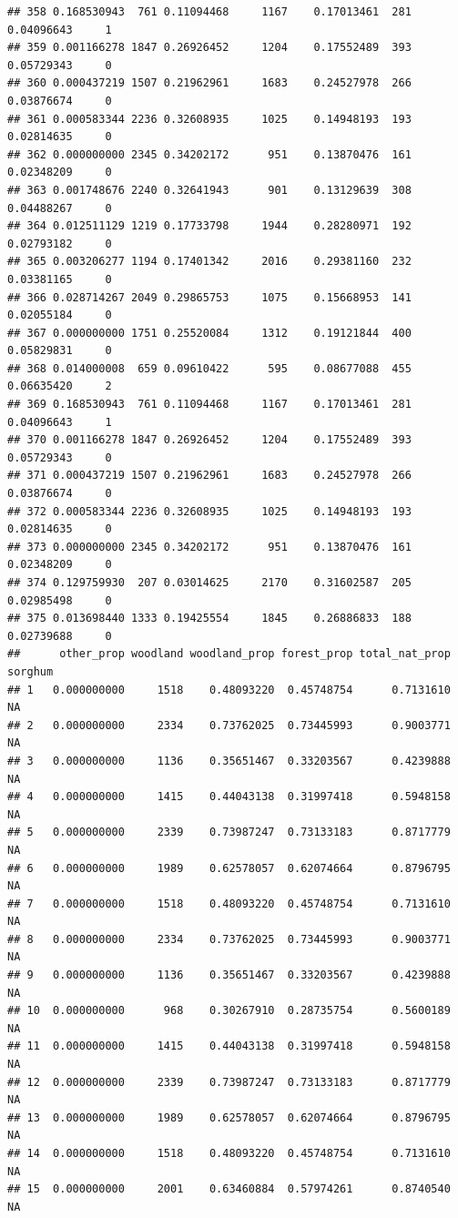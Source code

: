 \documentclass[
]{article}
\begin{document}
\begin{verbatim}
## 358 0.168530943  761 0.11094468     1167    0.17013461  281 0.04096643     1
## 359 0.001166278 1847 0.26926452     1204    0.17552489  393 0.05729343     0
## 360 0.000437219 1507 0.21962961     1683    0.24527978  266 0.03876674     0
## 361 0.000583344 2236 0.32608935     1025    0.14948193  193 0.02814635     0
## 362 0.000000000 2345 0.34202172      951    0.13870476  161 0.02348209     0
## 363 0.001748676 2240 0.32641943      901    0.13129639  308 0.04488267     0
## 364 0.012511129 1219 0.17733798     1944    0.28280971  192 0.02793182     0
## 365 0.003206277 1194 0.17401342     2016    0.29381160  232 0.03381165     0
## 366 0.028714267 2049 0.29865753     1075    0.15668953  141 0.02055184     0
## 367 0.000000000 1751 0.25520084     1312    0.19121844  400 0.05829831     0
## 368 0.014000008  659 0.09610422      595    0.08677088  455 0.06635420     2
## 369 0.168530943  761 0.11094468     1167    0.17013461  281 0.04096643     1
## 370 0.001166278 1847 0.26926452     1204    0.17552489  393 0.05729343     0
## 371 0.000437219 1507 0.21962961     1683    0.24527978  266 0.03876674     0
## 372 0.000583344 2236 0.32608935     1025    0.14948193  193 0.02814635     0
## 373 0.000000000 2345 0.34202172      951    0.13870476  161 0.02348209     0
## 374 0.129759930  207 0.03014625     2170    0.31602587  205 0.02985498     0
## 375 0.013698440 1333 0.19425554     1845    0.26886833  188 0.02739688     0
##      other_prop woodland woodland_prop forest_prop total_nat_prop sorghum
## 1   0.000000000     1518    0.48093220  0.45748754      0.7131610      NA
## 2   0.000000000     2334    0.73762025  0.73445993      0.9003771      NA
## 3   0.000000000     1136    0.35651467  0.33203567      0.4239888      NA
## 4   0.000000000     1415    0.44043138  0.31997418      0.5948158      NA
## 5   0.000000000     2339    0.73987247  0.73133183      0.8717779      NA
## 6   0.000000000     1989    0.62578057  0.62074664      0.8796795      NA
## 7   0.000000000     1518    0.48093220  0.45748754      0.7131610      NA
## 8   0.000000000     2334    0.73762025  0.73445993      0.9003771      NA
## 9   0.000000000     1136    0.35651467  0.33203567      0.4239888      NA
## 10  0.000000000      968    0.30267910  0.28735754      0.5600189      NA
## 11  0.000000000     1415    0.44043138  0.31997418      0.5948158      NA
## 12  0.000000000     2339    0.73987247  0.73133183      0.8717779      NA
## 13  0.000000000     1989    0.62578057  0.62074664      0.8796795      NA
## 14  0.000000000     1518    0.48093220  0.45748754      0.7131610      NA
## 15  0.000000000     2001    0.63460884  0.57974261      0.8740540      NA

\end{verbatim}
\end{document}
